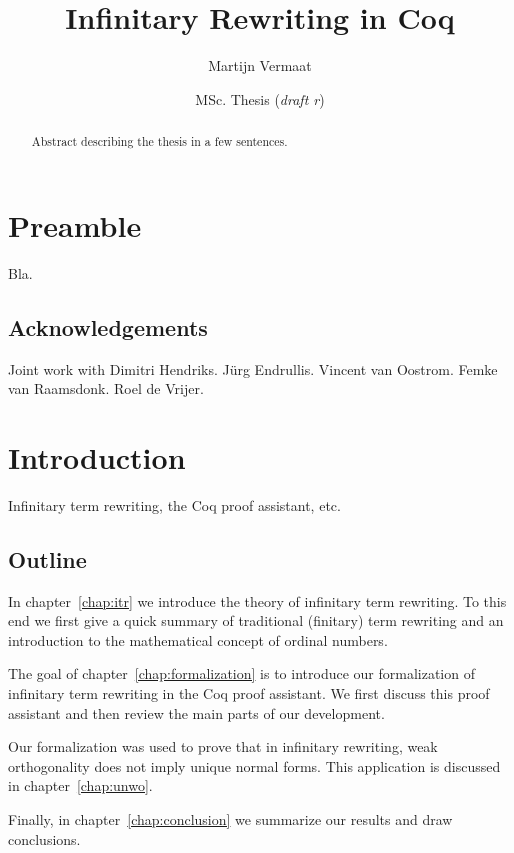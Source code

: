 \documentclass[11pt,oneside,a4paper,final]{report}
\title{Infinitary Rewriting in Coq}
\author{Martijn Vermaat}
\date{MSc. Thesis (\emph{draft r\svnrev})}
\theoremstyle{definition}
\begin{document}
\maketitle


\begin{abstract}
  Abstract describing the thesis in a few sentences.
\end{abstract}


\chapter*{Preamble}

Bla.


\section*{Acknowledgements}

Joint work with Dimitri Hendriks.
J\"urg Endrullis.
Vincent van Oostrom.
Femke van Raamsdonk.
Roel de Vrijer.


\tableofcontents


\chapter{Introduction}

Infinitary term rewriting, the Coq proof assistant, etc.


\section*{Outline}

In chapter~\ref{chap:itr} we introduce the theory of infinitary term
rewriting. To this end we first give a quick summary of traditional (finitary)
term rewriting and an introduction to the mathematical concept of ordinal
numbers.

The goal of chapter~\ref{chap:formalization} is to introduce our formalization
of infinitary term rewriting in the Coq proof assistant. We first discuss this
proof assistant and then review the main parts of our development.

Our formalization was used to prove that in infinitary rewriting, weak
orthogonality does not imply unique normal forms. This application is
discussed in chapter~\ref{chap:unwo}.

Finally, in chapter~\ref{chap:conclusion} we summarize our results and draw
conclusions.
\end{document}
